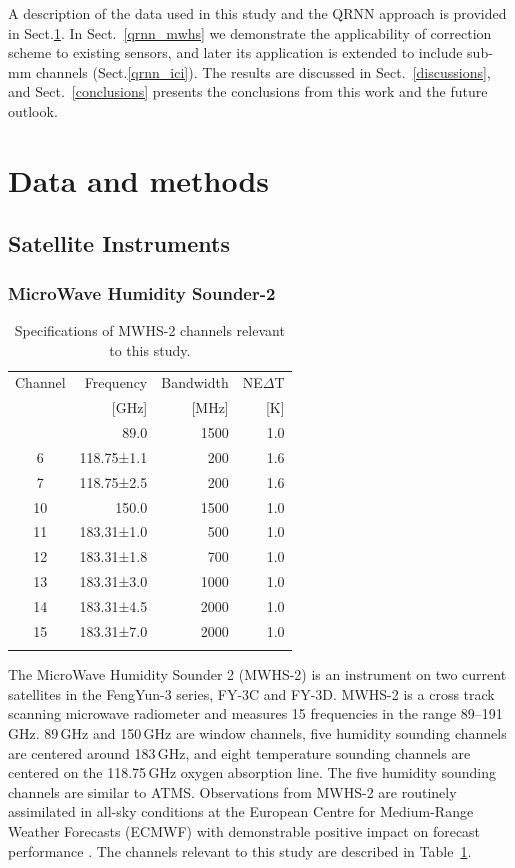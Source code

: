 \documentclass[amt, manuscript]{copernicus}
\begin{document}
A description of the data used in this study and the QRNN approach is provided
in Sect.\ref{data_methods}. In Sect.~\ref{qrnn_mwhs} we demonstrate the
applicability of correction scheme to existing sensors, and later its
application is extended to include sub-mm channels (Sect.\ref{qrnn_ici}). The
results are discussed in Sect.~\ref{discussions}, and Sect.~\ref{conclusions}
presents the conclusions from this work and the future outlook.


\section{Data and methods}
\label{data_methods}
%
\subsection{Satellite Instruments}
%
\subsubsection{ MicroWave Humidity Sounder-2}
%
\begin{table}[t]
	\caption{Specifications of MWHS-2 channels relevant to this study.}
	\label{tab:specifications_MWHS2}	
	\begin{tabular}{crrr}
		\tophline
		Channel & Frequency 	& Bandwidth & NE$\Delta$T \\
		& [GHz]			& [MHz]		& [K]		\\
		\middlehline
		1	&	89.0   		  & 1500			&	1.0	\\
		6	&	118.75±1.1    & \phantom{0}200 	&	1.6\\
		7	&	118.75±2.5    & \phantom{0}200 	&	1.6\\
		10	&	150.0         & 1500 			&	1.0 \\
		11	&	183.31±1.0      & \phantom{0}500  &	1.0 \\
		12  & 	183.31±1.8    & \phantom{0}700 	&   1.0\\
		13  & 	183.31±3.0      & 1000    		&	1.0	\\
		14  & 	183.31±4.5    & 2000    		&	1.0\\
		15  & 	183.31±7.0      & 2000  			&	1.0  \\
		\bottomhline
	\end{tabular}
	\belowtable{} %
\end{table}
The MicroWave Humidity Sounder 2 (MWHS-2) is an instrument on two current satellites in the FengYun-3 series, FY-3C and FY-3D. MWHS-2 is a cross track scanning microwave radiometer and measures 15 frequencies in the range 89--191\,GHz. 89\,GHz and 150\,GHz are window channels, five humidity sounding channels are centered around 183\,GHz, and eight temperature sounding channels are centered on the 118.75\,GHz oxygen absorption line. The five humidity sounding channels are similar to ATMS. Observations from MWHS-2 are routinely assimilated in all-sky conditions at the European Centre for Medium-Range Weather Forecasts (ECMWF) with demonstrable positive impact on forecast performance \citep{duncan2020MWHS}. The channels relevant to this study are described in Table~\ref{tab:specifications_MWHS2}. 
\end{document}
